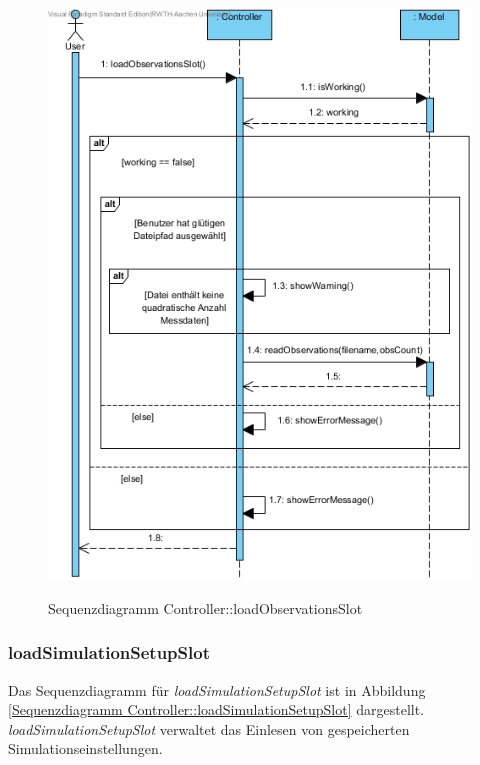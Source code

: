 \begin{figure}[H]
	\centering
	\includegraphics[scale=.5]{Bilder/Controller__loadObservationsSlot().jpg}\\
	\caption{Sequenzdiagramm Controller::loadObservationsSlot}
	\label{Sequenzdiagramm Controller::loadObservationsSlot}
\end{figure}

\subsubsection*{loadSimulationSetupSlot}

Das Sequenzdiagramm für \emph{loadSimulationSetupSlot} ist in Abbildung \ref{Sequenzdiagramm Controller::loadSimulationSetupSlot} dargestellt. \emph{loadSimulationSetupSlot} verwaltet das Einlesen von gespeicherten Simulationseinstellungen.

